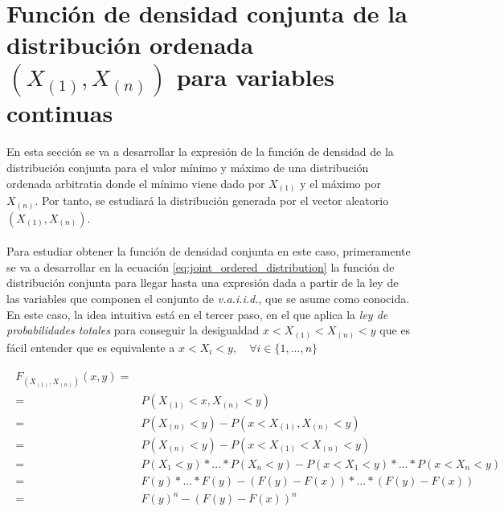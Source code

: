\documentclass{article}
\begin{document}
  \section{Función de densidad conjunta de la distribución ordenada $(X_{(1)}, X_{(n)})$ para variables continuas}
  \label{sec:e2}

    \paragraph{}
    En esta sección se va a desarrollar la expresión de la función de densidad de la distribución conjunta para el valor mínimo y máximo de una distribución ordenada arbitratia donde el mínimo viene dado por $X_{(1)}$ y el máximo por $X_{(n)}$. Por tanto, se estudiará la distribución generada por el vector aleatorio $(X_{(1)}, X_{(n)})$.

    \paragraph{}
    Para estudiar obtener la función de densidad conjunta en este caso, primeramente se va a desarrollar en la ecuación \ref{eq:joint_ordered_distribution} la función de distribución conjunta para llegar hasta una expresión dada a partir de la ley de las variables que componen el conjunto de \emph{v.a.i.i.d.}, que se asume como conocida. En este caso, la idea intuitiva está en el tercer paso, en el que aplica la \emph{ley de probabilidades totales} para conseguir la desigualdad $x < X_{(1)} < X_{(n)} < y$ que es fácil entender que es equivalente a $x < X_i < y,\quad \forall i \in \{1, ..., n\}$

    \begin{align}
    \label{eq:joint_ordered_distribution}
      \begin{split}
        F_{(X_{(1)}, X_{(n)})} (x,y) =& \\
        =& P(X_{(1)} < x, X_{(n)} < y) \\
        =& P(X_{(n)} < y) - P(x < X_{(1)}, X_{(n)} < y) \\
        =& P(X_{(n)} < y) - P(x < X_{(1)} < X_{(n)} < y) \\
        =& P(X_{1} < y) * ... * P(X_{n} < y) - P(x < X_1 < y) * ... * P(x < X_n < y) \\
        =& F(y) * ... *F(y)  - (F(y)-F(x)) * ... * (F(y)-F(x)) \\
        =& F(y)^n - (F(y)-F(x))^n
      \end{split}
    \end{align}
\end{document}
